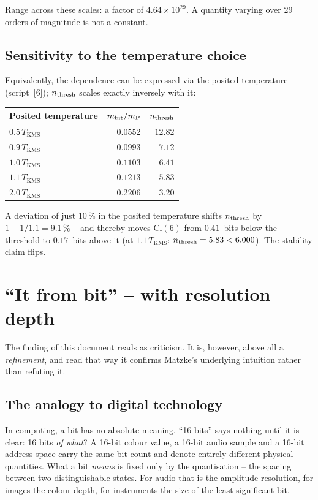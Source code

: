 Range across these scales: a factor of $4.64\times10^{29}$.
A quantity varying over 29 orders of magnitude is not a constant. \B

\subsection{Sensitivity to the temperature choice}

Equivalently, the dependence can be expressed via the posited temperature
(script~[6]); $n_{\mathrm{thresh}}$ scales exactly inversely with it:

\begin{center}
\small
\begin{tabular}{@{}lrr@{}}
  \toprule
  Posited temperature & $m_{\mathrm{bit}}/m_{\mathrm{P}}$ & $n_{\mathrm{thresh}}$ \\
  \midrule
  $0.5\,T_{\mathrm{KMS}}$ & $0.0552$ & $12.82$ \\
  $0.9\,T_{\mathrm{KMS}}$ & $0.0993$ & $7.12$ \\
  $1.0\,T_{\mathrm{KMS}}$ & $0.1103$ & $\mathbf{6.41}$ \\
  $1.1\,T_{\mathrm{KMS}}$ & $0.1213$ & $5.83$ \\
  $2.0\,T_{\mathrm{KMS}}$ & $0.2206$ & $3.20$ \\
  \bottomrule
\end{tabular}
\end{center}

A deviation of just $10\,\%$ in the posited temperature shifts $n_{\mathrm{thresh}}$ by
$1 - 1/1.1 = 9.1\,\%$ -- and thereby moves $\mathrm{Cl}(6)$ from $0.41$~bits below the
threshold to $0.17$~bits above it (at $1.1\,T_{\mathrm{KMS}}$:
$n_{\mathrm{thresh}} = 5.83 < 6.000$).
The stability claim flips.

\section{\enquote{It from bit} -- with resolution depth}

The finding of this document reads as criticism. It is, however, above all
a \emph{refinement}, and read that way it confirms Matzke's underlying
intuition rather than refuting it.

\subsection{The analogy to digital technology}

In computing, a bit has no absolute meaning.
\enquote{16 bits} says nothing until it is clear: 16 bits \emph{of what}?
A 16-bit colour value, a 16-bit audio sample and a 16-bit address space
carry the same bit count and denote entirely different physical
quantities. What a bit \emph{means} is fixed only by the quantisation --
the spacing between two distinguishable states. For audio that is the
amplitude resolution, for images the colour depth, for instruments the
size of the least significant bit.

